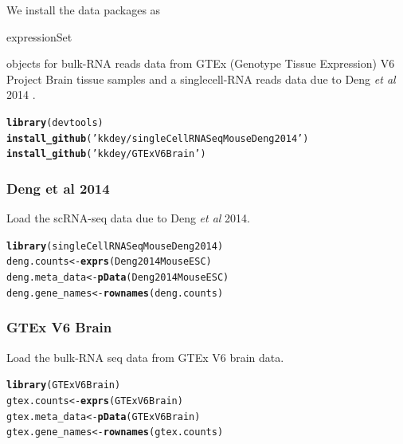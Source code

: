 \documentclass[12pt]{article}\usepackage[]{graphicx}\usepackage[usenames,dvipsnames]{color}
\makeatletter
\newcommand{\hlstr}[1]{\textcolor[rgb]{0.192,0.494,0.8}{#1}}%
\newcommand{\hlstd}[1]{\textcolor[rgb]{0.345,0.345,0.345}{#1}}%
\newcommand{\hlkwb}[1]{\textcolor[rgb]{0.69,0.353,0.396}{#1}}%
\newcommand{\hlkwd}[1]{\textcolor[rgb]{0.737,0.353,0.396}{\textbf{#1}}}%
\newenvironment{kframe}{%
 \def\at@end@of@kframe{}%
 \ifinner\ifhmode%
  \def\at@end@of@kframe{\end{minipage}}%
  \begin{minipage}{\columnwidth}%
 \fi\fi%
 \def\FrameCommand##1{\hskip\@totalleftmargin \hskip-\fboxsep
 \colorbox{shadecolor}{##1}\hskip-\fboxsep
     \hskip-\linewidth \hskip-\@totalleftmargin \hskip\columnwidth}%
 \MakeFramed {\advance\hsize-\width
   \@totalleftmargin\z@ \linewidth\hsize
   \@setminipage}}%
 {\par\unskip\endMakeFramed%
 \at@end@of@kframe}
\newenvironment{knitrout}{}{} %
\makeatother
\begin{document}
We install the data packages as \begin{verb} expressionSet \end{verb} objects for bulk-RNA reads data from GTEx (Genotype Tissue Expression) V6 Project Brain tissue samples \cite{GTEX2013} and a singlecell-RNA reads data due to Deng \textit{et al} 2014 \cite{Deng2014}.


\begin{knitrout}
\color{fgcolor}\begin{kframe}
\begin{alltt}
\hlkwd{library}\hlstd{(devtools)}
\hlkwd{install_github}\hlstd{(}\hlstr{'kkdey/singleCellRNASeqMouseDeng2014'}\hlstd{)}
\hlkwd{install_github}\hlstd{(}\hlstr{'kkdey/GTExV6Brain'}\hlstd{)}
\end{alltt}
\end{kframe}
\end{knitrout}

\subsubsection{Deng et al 2014}

Load the scRNA-seq data due to Deng \textit{et al} 2014.

\begin{knitrout}
\color{fgcolor}\begin{kframe}
\begin{alltt}
\hlkwd{library}\hlstd{(singleCellRNASeqMouseDeng2014)}
\hlstd{deng.counts} \hlkwb{<-} \hlkwd{exprs}\hlstd{(Deng2014MouseESC)}
\hlstd{deng.meta_data} \hlkwb{<-} \hlkwd{pData}\hlstd{(Deng2014MouseESC)}
\hlstd{deng.gene_names} \hlkwb{<-} \hlkwd{rownames}\hlstd{(deng.counts)}
\end{alltt}
\end{kframe}
\end{knitrout}

\subsubsection{GTEx V6 Brain}

Load the bulk-RNA seq data from GTEx V6 brain data.

\begin{knitrout}
\color{fgcolor}\begin{kframe}
\begin{alltt}
\hlkwd{library}\hlstd{(GTExV6Brain)}
\hlstd{gtex.counts} \hlkwb{<-} \hlkwd{exprs}\hlstd{(GTExV6Brain)}
\hlstd{gtex.meta_data} \hlkwb{<-} \hlkwd{pData}\hlstd{(GTExV6Brain)}
\hlstd{gtex.gene_names} \hlkwb{<-} \hlkwd{rownames}\hlstd{(gtex.counts)}
\end{alltt}
\end{kframe}
\end{knitrout}
\end{document}

